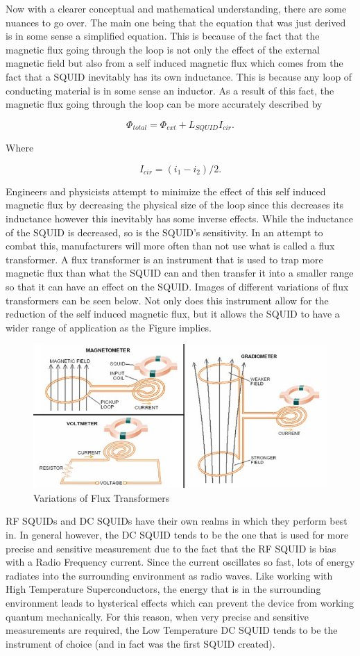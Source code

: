\documentclass[conf]{new-aiaa}
\begin{document}
\pagebreak

Now with a clearer conceptual and mathematical understanding, there are some nuances to go over. The main one being that the equation that was just derived is in some sense a simplified equation. This is because of the fact that the magnetic flux going through the loop is not only the effect of the external magnetic field but also from a self induced magnetic flux which comes from the fact that a SQUID inevitably has its own inductance. This is because any loop of conducting material is in some sense an inductor. As a result of this fact, the magnetic flux going through the loop can be more accurately described by 

$$\Phi_{total} = \Phi_{ext} + L_{SQUID}I_{cir}.$$

Where 

$$I_{cir} = (i_{1} - i_{2})/2.$$

Engineers and physicists attempt to minimize the effect of this self induced magnetic flux by decreasing the physical size of the loop since this decreases its inductance however this inevitably has some inverse effects. While the inductance of the SQUID is decreased, so is the SQUID's sensitivity. In an attempt to combat this, manufacturers will more often than not use what is called a flux transformer. A flux transformer is an instrument that is used to trap more magnetic flux than what the SQUID can and then transfer it into a smaller range so that it can have an effect on the SQUID. Images of different variations of flux transformers can be seen below. Not only does this instrument allow for the reduction of the self induced magnetic flux, but it allows the SQUID to have a wider range of application as the Figure implies. 

\begin{figure}[!h]
    \centering
    \includegraphics[width = .7\linewidth]{fluxtransformer.jpg}
    \caption{Variations of Flux Transformers}
\end{figure}

RF SQUIDs and DC SQUIDs have their own realms in which they perform best in. In general however, the DC SQUID tends to be the one that is used for more precise and sensitive measurement due to the fact that the RF SQUID is bias with a Radio Frequency current. Since the current oscillates so fast, lots of energy radiates into the surrounding environment as radio waves. Like working with High Temperature Superconductors, the energy that is in the surrounding environment leads to hysterical effects which can prevent the device from working quantum mechanically. For this reason, when very precise and sensitive measurements are required, the Low Temperature DC SQUID tends to be the instrument of choice (and in fact was the first SQUID created).
\end{document}
